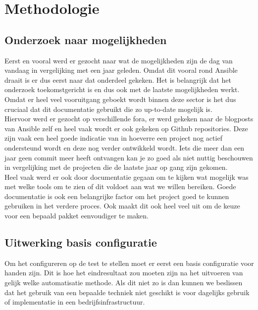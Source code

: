 
\chapter{Methodologie}
\label{ch:methodologie}

\section{Onderzoek naar mogelijkheden}
\label{ch:mogelijkheden}

Eerst en vooral werd er gezocht naar wat de mogelijkheden zijn de dag van vandaag in vergelijking met een jaar geleden. Omdat dit vooral rond Ansible draait is er dus eerst naar dat onderdeel gekeken. Het is belangrijk dat het onderzoek toekomstgericht is en dus ook met de laatste mogelijkheden werkt. Omdat er heel veel vooruitgang geboekt wordt binnen deze sector is het dus cruciaal dat dit documentatie gebruikt die zo up-to-date mogelijk is. 
\\

Hiervoor werd er gezocht op verschillende fora, er werd gekeken naar de blogposts van Ansible zelf en heel vaak wordt er ook gekeken op Github repositories. Deze zijn vaak een heel goede indicatie van in hoeverre een project nog actief ondersteund wordt en deze nog verder ontwikkeld wordt. Iets die meer dan een jaar geen commit meer heeft ontvangen kan je zo goed als niet nuttig beschouwen in vergelijking met de projecten die de laatste jaar op gang zijn gekomen. 
\\

Heel vaak werd er ook door documentatie gegaan om te kijken wat mogelijk was met welke tools om te zien of dit voldoet aan wat we willen bereiken. Goede documentatie is ook een belangrijke factor om het project goed te kunnen gebruiken in het verdere proces. Ook maakt dit ook heel veel uit om de keuze voor een bepaald pakket eenvoudiger te maken. 

\section{Uitwerking basis configuratie}
\label{ch:configuratie}

Om het configureren op de test te stellen moet er eerst een basis configuratie voor handen zijn. Dit is hoe het eindresultaat zou moeten zijn na het uitvoeren van gelijk welke automatisatie methode. Als dit niet zo is dan kunnen we beslissen dat het gebruik van een bepaalde techniek niet geschikt is voor dagelijks gebruik of implementatie in een bedrijfsinfrastructuur.
\\

